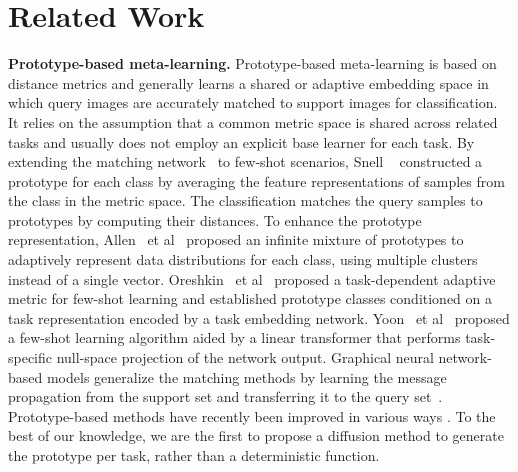 
\section{Related Work}

\textbf{Prototype-based meta-learning.} 
Prototype-based meta-learning is based on distance metrics and generally learns a shared or adaptive embedding space in which query images are accurately matched to support images for classification. It relies on the assumption that a common metric space is shared across related tasks and usually does not employ an explicit base learner for each task. By extending the matching network~\cite{vinyals2016matching} to few-shot scenarios, Snell \etal~\cite{snell2017prototypical} constructed a prototype for each class by averaging the feature representations of samples from the class in the metric space. The classification matches the query samples to prototypes by computing their distances. To enhance the prototype representation, Allen \ et al~\cite {allen2019infinite} proposed an infinite mixture of prototypes to adaptively represent data distributions for each class, using multiple clusters instead of a single vector. Oreshkin \ et al~\cite {oreshkin2018tadam} proposed a task-dependent adaptive metric for few-shot learning and established prototype classes conditioned on a task representation encoded by a task embedding network. Yoon \ et al~\cite {yoon2019tapnet} proposed a few-shot learning algorithm aided by a linear transformer that performs task-specific null-space projection of the network output. Graphical neural network-based models generalize the matching methods by learning the message propagation from the support set and transferring it to the query set~\cite{garcia2018few}. Prototype-based methods have recently been improved in various ways \cite{cao2019theoretical,triantafillou2019meta,zhen2020memory}. To the best of our knowledge, we are the first to propose a diffusion method to generate the prototype per task, rather than a deterministic function.


